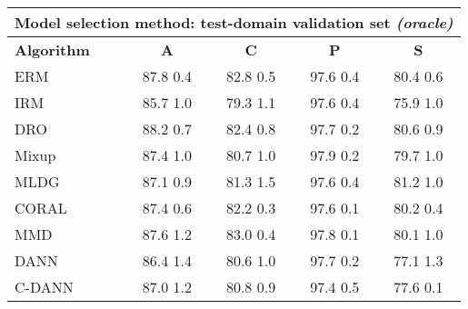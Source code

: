 \documentclass{article}
\begin{document}
\begin{center}
\begin{tabular}{lcccc}
\toprule
\multicolumn{5}{c}{\textbf{Model selection method: test-domain validation set \textit{(oracle)}}} \\
\midrule
\textbf{Algorithm}    & \textbf{A}                & \textbf{C}                & \textbf{P}                & \textbf{S}                \\
\midrule
ERM                       & 87.8  0.4            & 82.8  0.5            & 97.6  0.4            & 80.4  0.6            \\
IRM                       & 85.7  1.0            & 79.3  1.1            & 97.6  0.4            & 75.9  1.0            \\
DRO                 & 88.2  0.7            & 82.4  0.8            & 97.7  0.2            & 80.6  0.9            \\
Mixup                     & 87.4  1.0            & 80.7  1.0            & 97.9  0.2            & 79.7  1.0            \\
MLDG                      & 87.1  0.9            & 81.3  1.5            & 97.6  0.4            & 81.2  1.0            \\
CORAL                     & 87.4  0.6            & 82.2  0.3            & 97.6  0.1            & 80.2  0.4            \\
MMD                       & 87.6  1.2            & 83.0  0.4            & 97.8  0.1            & 80.1  1.0            \\
DANN                       & 86.4  1.4            & 80.6  1.0            & 97.7  0.2            & 77.1  1.3            \\
C-DANN                   & 87.0  1.2            & 80.8  0.9            & 97.4  0.5            & 77.6  0.1            \\
\bottomrule
\end{tabular}
\end{center}

\clearpage
\newpage
\end{document}
